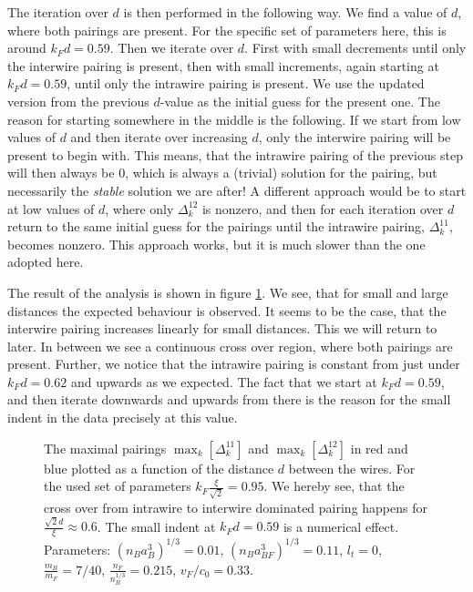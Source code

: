 The iteration over $d$ is then performed in the following way. We find a value of $d$, where both pairings are present. For the specific set of parameters here, this is around $k_Fd = 0.59$. Then we iterate over $d$. First with small decrements until only the interwire pairing is present, then with small increments, again starting at $k_Fd = 0.59$, until only the intrawire pairing is present. We use the updated version from the previous $d$-value as the initial guess for the present one. The reason for starting somewhere in the middle is the following. If we start from low values of $d$ and then iterate over increasing $d$, only the interwire pairing will be present to begin with. This means, that the intrawire pairing of the previous step will then always be $0$, which is always a (trivial) solution for the pairing, but necessarily the \textit{stable} solution we are after! A different approach would be to start at low values of $d$, where only $\Delta^{12}_k$ is nonzero, and then for each iteration over $d$ return to the same initial guess for the pairings until the intrawire pairing, $\Delta^{11}_k$, becomes nonzero. This approach works, but it is much slower than the one adopted here.  

The result of the analysis is shown in figure \ref{fig.maximalpairingddepend}. We see, that for small and large distances the expected behaviour is observed. It seems to be the case, that the interwire pairing increases linearly for small distances. This we will return to later. In between we see a continuous cross over region, where both pairings are present. Further, we notice that the intrawire pairing is constant from just under $k_Fd = 0.62$ and upwards as we expected. The fact that we start at $k_Fd =0.59$, and then iterate downwards and upwards from there is the reason for the small indent in the data precisely at this value.

\begin{figure} 
\begin{center}  
  
\caption{The maximal pairings $\max_k\left[\Delta^{11}_k\right]$ and $\max_k\left[\Delta^{12}_k\right]$ in red and blue plotted as a function of the distance $d$ between the wires. For the used set of parameters $k_F\frac{\xi}{\sqrt{2}} = 0.95$. We hereby see, that the cross over from intrawire to interwire dominated pairing happens for $\frac{\sqrt{2}d}{\xi} \approx 0.6$. The small indent at $k_Fd = 0.59$ is a numerical effect. Parameters: $(n_Ba_B^3)^{1/3} = 0.01$, $(n_Ba_{BF}^3)^{1/3} = 0.11$, $l_t = 0$, $\frac{m_B}{m_F} = 7/40$, $\frac{n_F}{n_B^{1/3}} = 0.215$, $v_F/c_0 = 0.33$. }  
\label{fig.maximalpairingddepend}  
\end{center}    
\end{figure}

